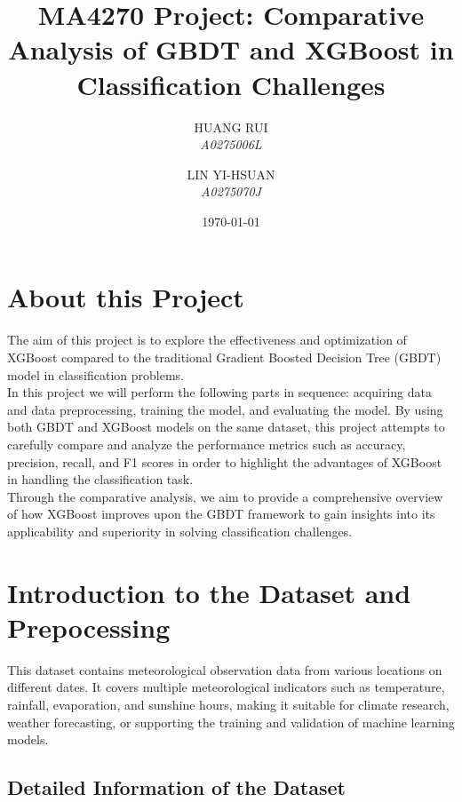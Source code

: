 \documentclass[12pt]{article}
\title{MA4270 Project: Comparative Analysis of GBDT and XGBoost in Classification Challenges}
\author{
    HUANG RUI\\
    \textit{A0275006L}
    \and
    LIN YI-HSUAN\\
    \textit{A0275070J}
}
\date{\today}
\begin{document}
\maketitle

\section{About this Project}
The aim of this project is to explore the effectiveness and optimization of XGBoost compared to the traditional Gradient Boosted Decision Tree (GBDT) model in classification problems. \\

In this project we will perform the following parts in sequence: acquiring data and data preprocessing, training the model, and evaluating the model. By using both GBDT and XGBoost models on the same dataset, this project attempts to carefully compare and analyze the performance metrics such as accuracy, precision, recall, and F1 scores in order to highlight the advantages of XGBoost in handling the classification task. \\

Through the comparative analysis, we aim to provide a comprehensive overview of how XGBoost improves upon the GBDT framework to gain insights into its applicability and superiority in solving classification challenges.\\

\section{Introduction to the Dataset and Prepocessing}
This dataset contains meteorological observation data from various locations on different dates. It covers multiple meteorological indicators such as temperature, rainfall, evaporation, and sunshine hours, making it suitable for climate research, weather forecasting, or supporting the training and validation of machine learning models.

\subsection{Detailed Information of the Dataset}
\end{document}
